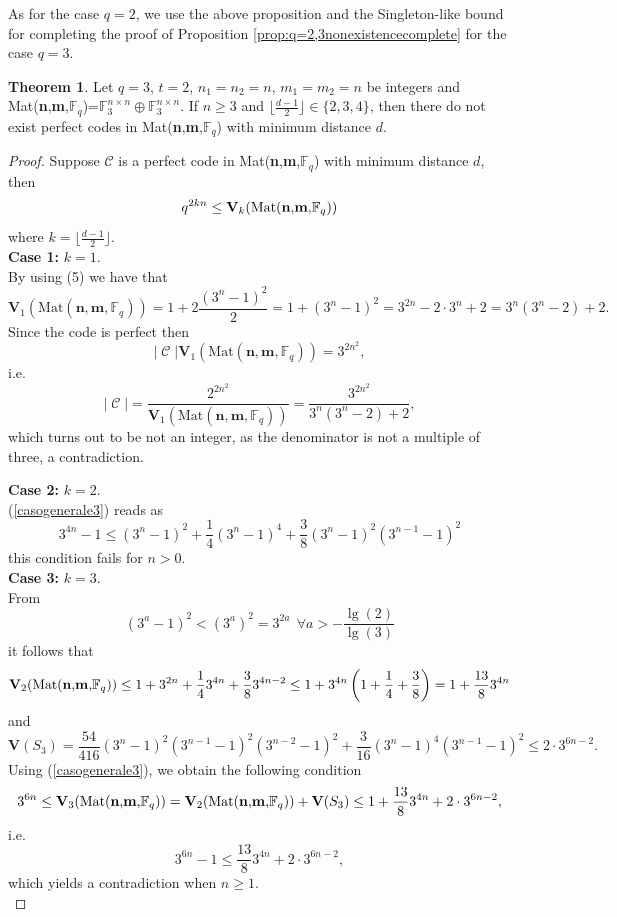 \documentclass[11pt]{amsart}
\DeclareMathOperator{\C}{\mathcal{C}}
\theoremstyle{definition}
\newtheorem{theorem}{Theorem}[section]
\begin{document}
As for the case $q=2$, we use the above proposition and the Singleton-like bound for completing the proof of Proposition \ref{prop:q=2,3nonexistencecomplete} for the case $q=3$.

\begin{theorem}
Let $q=3$, $t=2$, $n_1=n_2=n$, $m_1=m_2=n$ be integers and Mat(\textbf{n},\textbf{m},$\mathbb{F}_q$)=$\mathbb{F}_3^{n\times n}\oplus\mathbb{F}_3^{n\times n}$. If $n\geq3$ and $\lfloor\frac{d-1}{2}\rfloor\in\{2,3,4\}$, then there do not exist perfect codes in Mat(\textbf{n},\textbf{m},$\mathbb{F}_q$) with minimum distance $d$.
\end{theorem}
\begin{proof}
Suppose $\mathcal{C}$ is a perfect code in Mat(\textbf{n},\textbf{m},$\mathbb{F}_q$) with minimum distance $d$, then
\begin{equation}\label{casogenerale3}
	q^{2kn}\leq\textbf{V}_k(\text{Mat(\textbf{n},\textbf{m},$\mathbb{F}_q$)})
\end{equation}
where $k=\lfloor\frac{d-1}{2}\rfloor$.\\

\textbf{Case 1:} $k=1$.\\
By using (5) we have that
\[
\mathbf{V}_1(\text{Mat}(\textbf{n},\textbf{m},\mathbb{F}_q))=1+2\frac{(3^n-1)^2}2=1+(3^n-1)^2=3^{2n}-2\cdot 3^n+2=3^n(3^n-2)+2.
\]
Since the code is perfect then 
\[ |\C| \mathbf{V}_1(\text{Mat}(\textbf{n},\textbf{m},\mathbb{F}_q))=3^{2n^2},  \]
i.e. 
\[ |\C|=\frac{2^{2n^2}}{ \mathbf{V}_1(\text{Mat}(\textbf{n},\textbf{m},\mathbb{F}_q))}=\frac{3^{2n^2}}{3^n(3^n-2)+2},  \]
which turns out to be not an integer, as the denominator is not a multiple of three, a contradiction.

\textbf{Case 2:} $k=2$.\\
(\ref{casogenerale3}) reads as
\[
3^{4n}-1\leq(3^n-1)^2+\frac{1}{4}(3^n-1)^4+\frac{3}{8}(3^n-1)^2(3^{n-1}-1)^2
\]
this condition fails for $n>0$.\\

\textbf{Case 3:} $k=3$.\\
From
\begin{equation}\label{dis_3}
	(3^a-1)^2<(3^a)^2=3^{2a} \ \ \forall a>-\frac{\lg(2)}{\lg(3)}
\end{equation}
it follows that
\[
\textbf{V}_2(\text{Mat(\textbf{n},\textbf{m},$\mathbb{F}_q$)})\leq1+3^{2n}+\frac{1}{4}3^{4n}+\frac{3}{8}3^{4n-2}\leq1+3^{4n}\left(1+\frac{1}{4}+\frac{3}{8}\right)=1+\frac{13}{8}3^{4n}
\]
and
\[
\textbf{V}(S_3)=\frac{54}{416}(3^n-1)^2(3^{n-1}-1)^2(3^{n-2}-1)^2+\frac{3}{16}(3^n-1)^4(3^{n-1}-1)^2\leq2\cdot3^{6n-2}.
\]
Using (\ref{casogenerale3}), we obtain the following condition
\[
3^{6n}\leq\textbf{V}_3(\text{Mat(\textbf{n},\textbf{m},$\mathbb{F}_q$)})= \textbf{V}_2(\text{Mat(\textbf{n},\textbf{m},$\mathbb{F}_q$)})+\textbf{V}(S_3)\leq1+\frac{13}{8}3^{4n}+2\cdot3^{6n-2},
\]
i.e.
\[
3^{6n}-1\leq \frac{13}{8}3^{4n}+2\cdot3^{6n-2},
\]
which yields a contradiction when $n\geq1$.\\


\end{proof}
\end{document}
